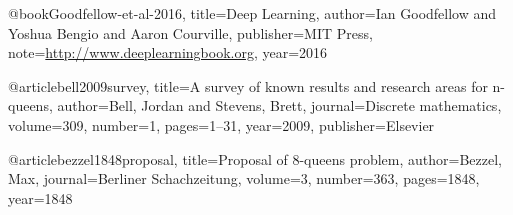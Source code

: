 @book{Goodfellow-et-al-2016,
    title={Deep Learning},
    author={Ian Goodfellow and Yoshua Bengio and Aaron Courville},
    publisher={MIT Press},
    note={\url{http://www.deeplearningbook.org}},
    year={2016}
}

@article{bell2009survey,
	title={A survey of known results and research areas for n-queens},
	author={Bell, Jordan and Stevens, Brett},
	journal={Discrete mathematics},
	volume={309},
	number={1},
	pages={1--31},
	year={2009},
	publisher={Elsevier}
}

@article{bezzel1848proposal,
	title={Proposal of 8-queens problem},
	author={Bezzel, Max},
	journal={Berliner Schachzeitung},
	volume={3},
	number={363},
	pages={1848},
	year={1848}
}